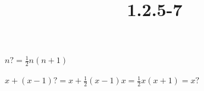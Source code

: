 \documentclass{article}
\title{1.2.5-7}
\begin{document}
\maketitle

$n? = \frac{1}{2}n(n+1)$

$x+(x-1)? = x + \frac{1}{2}(x-1)x = \frac{1}{2}x(x+1) = x?$
\end{document}
